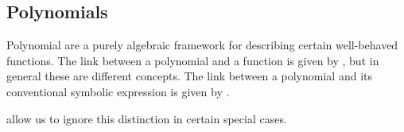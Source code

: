 \subsection{Polynomials}\label{subsec:polynomials}

\begin{remark}\label{rem:polynomials_vs_polynomial_functions}
  Polynomial are a purely algebraic framework for describing certain well-behaved functions. The link between a polynomial and a function is given by , but in general these are different concepts. The link between a polynomial and its conventional symbolic expression is given by .

   allow us to ignore this distinction in certain special cases.
\end{remark}

